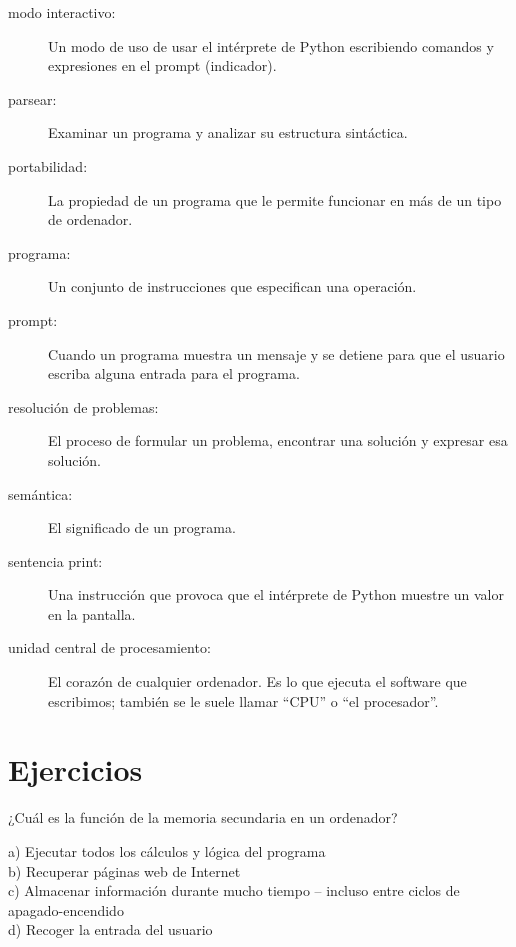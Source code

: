 \begin{description}
\item[modo interactivo:] Un modo de uso de usar el intérprete de Python
escribiendo comandos y expresiones en el prompt (indicador).

\item[parsear:] Examinar un programa y analizar su estructura sintáctica.

\item[portabilidad:]  La propiedad de un programa que le permite funcionar en más
de un tipo de ordenador.

\item[programa:] Un conjunto de instrucciones que especifican una operación.

\item[prompt:] Cuando un programa muestra un mensaje y se detiene para que
el usuario escriba alguna entrada para el programa.

\item[resolución de problemas:]  El proceso de formular un problema, encontrar
una solución y expresar esa solución.

\item[semántica:] El significado de un programa.

\item[sentencia print:]  Una instrucción que provoca que el intérprete de Python
muestre un valor en la pantalla.

\item[unidad central de procesamiento:] El corazón de cualquier ordenador. Es lo que
ejecuta el software que escribimos; también se le suele llamar ``CPU'' o ``el procesador''.

\end{description}

\section{Ejercicios}


\begin{ex}
¿Cuál es la función de la memoria secundaria en un ordenador?

a) Ejecutar todos los cálculos y lógica del programa\\
b) Recuperar páginas web de Internet\\
c) Almacenar información durante mucho tiempo -- incluso entre ciclos de apagado-encendido\\
d) Recoger la entrada del usuario
\end{ex}

